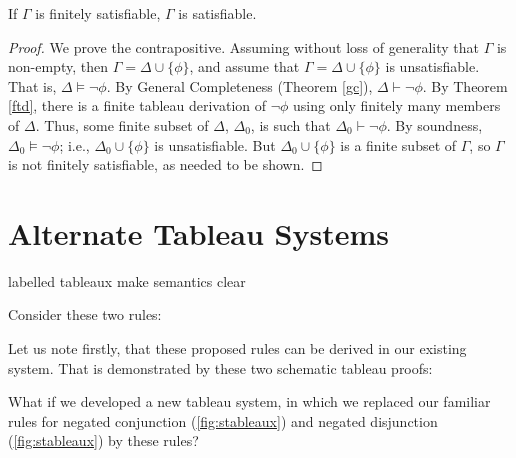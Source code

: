 \begin{theorem}[Compactness]
	If $\Gamma$ is finitely satisfiable, $\Gamma$ is satisfiable.
\end{theorem} \begin{proof}
	We prove the contrapositive. Assuming without loss of generality that $\Gamma$ is non-empty, then $\Gamma = \Delta \cup\{\phi\}$, and assume that $\Gamma=\Delta \cup\{\phi\}$ is unsatisfiable. That is, $\Delta \vDash \neg\phi$. By General Completeness (Theorem \ref{gc}), $\Delta \vdash \neg\phi$. By Theorem \ref{ftd}, there is a finite tableau derivation of $\neg\phi$ using only finitely many members of $\Delta$. Thus, some finite subset of $\Delta$, $\Delta_{0}$, is such that $\Delta_{0}\vdash\neg\phi$. By soundness, $\Delta_{0}\vDash\neg\phi$; i.e., $\Delta_{0}\cup\{\phi\}$ is unsatisfiable. But $\Delta_{0}\cup\{\phi\}$ is a finite subset of $\Gamma$, so $\Gamma$ is not finitely satisfiable, as needed to be shown.
 \end{proof}
	

\section{Alternate Tableau Systems}

labelled tableaux make semantics clear

Consider these two rules: \begin{center}
	{\leaf{$\neg\phi\vee\neg\psi$}\qobitree} 
\end{center}

Let us note firstly, that these proposed rules can be derived in our existing system. That is demonstrated by these two schematic tableau proofs:
\begin{center}
	{\leaf{$\neg\phi\vee\neg\psi$}\qobitree} 
\end{center}


What if we developed a new tableau system, in which we replaced our familiar rules for negated conjunction (\autoref{fig:stableaux}) and negated disjunction (\autoref{fig:stableaux}) by these rules?




